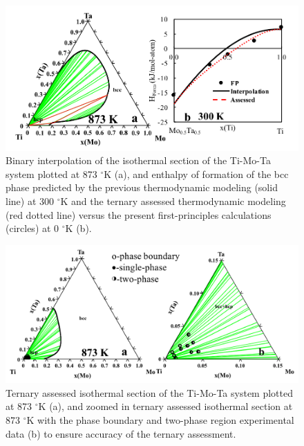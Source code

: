 \newpage
\begin{figure}[H]
	\centering
	\includegraphics[width=\textwidth]{Chapter-3/Figures/TiMoTa1.png}
	\caption{Binary interpolation of the isothermal section of the Ti-Mo-Ta system plotted at 873 $^{\circ}$K (a), and enthalpy of formation of the bcc phase predicted by the previous thermodynamic modeling (solid line) at 300 $^{\circ}$K and the ternary assessed thermodynamic modeling (red dotted line) versus the present first-principles calculations (circles) at 0 $^{\circ}$K (b).}
	\label{Ch3-figure:TiMoTa1}
\end{figure}

\newpage
\begin{figure}[H]
	\centering
	\includegraphics[width=\textwidth]{Chapter-3/Figures/TiMoTa2.png}
	\caption{Ternary assessed isothermal section of the Ti-Mo-Ta system plotted at 873 $^{\circ}$K (a), and zoomed in ternary assessed isothermal section at 873 $^{\circ}$K with the phase boundary and two-phase region experimental data \cite{Nikitin1971} (b) to ensure accuracy of the ternary assessment.}
	\label{Ch3-figure:TiMoTa2}
\end{figure}

